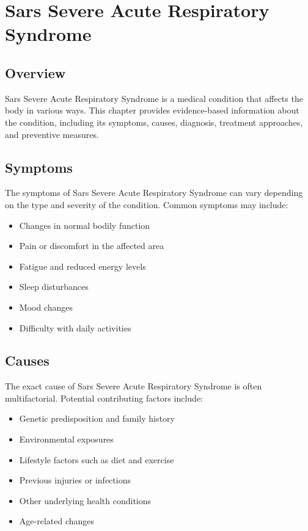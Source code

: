 \chapter{Sars Severe Acute Respiratory Syndrome}

\section*{Overview}
Sars Severe Acute Respiratory Syndrome is a medical condition that affects the body in various ways. This chapter provides evidence-based information about the condition, including its symptoms, causes, diagnosis, treatment approaches, and preventive measures.

\section*{Symptoms}
The symptoms of Sars Severe Acute Respiratory Syndrome can vary depending on the type and severity of the condition. Common symptoms may include:

\begin{itemize}
\item Changes in normal bodily function
\item Pain or discomfort in the affected area
\item Fatigue and reduced energy levels
\item Sleep disturbances
\item Mood changes
\item Difficulty with daily activities
\end{itemize}

\section*{Causes}
The exact cause of Sars Severe Acute Respiratory Syndrome is often multifactorial. Potential contributing factors include:

\begin{itemize}
\item Genetic predisposition and family history
\item Environmental exposures
\item Lifestyle factors such as diet and exercise
\item Previous injuries or infections
\item Other underlying health conditions
\item Age-related changes
\end{itemize}

